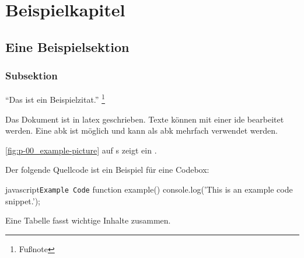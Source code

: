 \chapter{Beispielkapitel}
\label{ch:01_example}

\section{Eine Beispielsektion}
\label{sec:01-00_example}

\subsection{Subsektion}
\label{subsec:01-00-00_subsection}

\enquote{Das ist ein Beispielzitat.} \footnote{Fußnote}

Das Dokument ist in \Gls{latex} geschrieben.
Texte können mit einer \gls{ide} bearbeitet werden.
Eine \gls{abk} ist möglich und kann als \gls{abk} mehrfach verwendet werden.

\lipsum[1-3]

\autoref{fig:p-00_example-picture} auf \Acrlong{s} \pageref{fig:p-00_example-picture} zeigt ein .


\lipsum[4-5]

Der folgende Quellcode ist ein Beispiel für eine Codebox:

\begin{snippet}[H]
    \centering
    \begin{codebox}{javascript}{\texttt{Example Code}}
		function example() {
			console.log('This is an example code snippet.');
		}
    \end{codebox}
    \caption{\texttt{Example Code} als Auszug aus einer Software}
    \label{snippet:01-00-00_example-code}
\end{snippet}

\lipsum[6]

Eine Tabelle fasst wichtige Inhalte zusammen.

